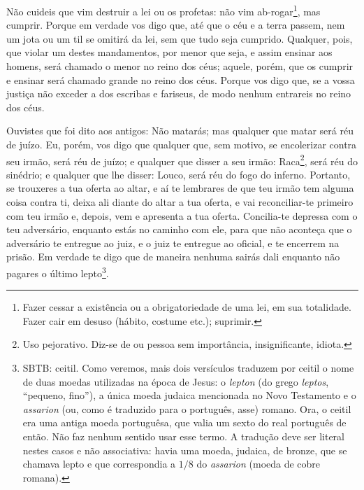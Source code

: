 Não cuideis que vim destruir a lei ou os profetas: não vim
ab-rogar\footnote{Fazer cessar a existência ou a obrigatoriedade de
uma lei, em sua totalidade. Fazer cair em desuso (hábito, costume
etc.); suprimir.}, mas cumprir. Porque em verdade vos digo
que, até que o céu e a terra passem, nem um jota ou um til se
omitirá da lei, sem que tudo seja cumprido. Qualquer, pois,
que violar um destes mandamentos, por menor que seja, e assim
ensinar aos homens, será chamado o menor no reino dos céus; aquele,
porém, que os cumprir e ensinar será chamado grande no reino dos
céus. Porque vos digo que, se a vossa justiça não exceder a
dos escribas e fariseus, de modo nenhum entrareis no reino dos céus.

Ouvistes que foi dito aos antigos: Não matarás; mas qualquer que
matar será réu de juízo. Eu, porém, vos digo que qualquer
que, sem motivo, se encolerizar contra seu irmão, será réu de juízo;
e qualquer que disser a seu irmão: Raca\footnote{Uso pejorativo.
Diz-se de ou pessoa sem importância, insignificante, idiota.}, será
réu do sinédrio; e qualquer que lhe disser: Louco, será réu do fogo
do inferno. Portanto, se trouxeres a tua oferta ao altar, e
aí te lembrares de que teu irmão tem alguma coisa contra ti,
deixa ali diante do altar a tua oferta, e vai reconciliar-te
primeiro com teu irmão e, depois, vem e apresenta a tua oferta.
Concilia-te depressa com o teu adversário, enquanto estás no
caminho com ele, para que não aconteça que o adversário te entregue
ao juiz, e o juiz te entregue ao oficial, e te encerrem na prisão.
Em verdade te digo que de maneira nenhuma sairás dali
enquanto não pagares o último lepto\footnote{SBTB: ceitil. Como
veremos, mais dois versículos traduzem por ceitil o nome de duas
moedas utilizadas na época de Jesus: o \emph{lepton} (do grego
\emph{leptos}, ``pequeno, fino''), a única moeda judaica mencionada
no Novo Testamento e o \emph{assarion} (ou, como é traduzido para o
português, asse) romano. Ora, o ceitil era uma antiga moeda
portuguêsa, que valia um sexto do real português de então. Não faz
nenhum sentido usar esse termo. A tradução deve ser literal nestes
casos e não associativa: havia uma moeda, judaica, de bronze, que se
chamava lepto e que correspondia a $1/8$ do \emph{assarion} (moeda
de cobre romana).}.

